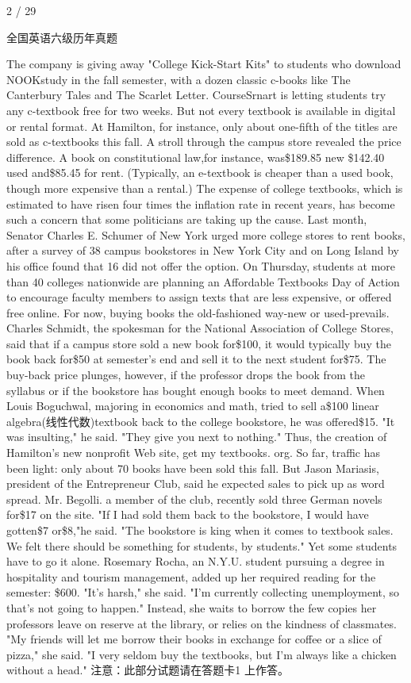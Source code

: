 \documentclass[UTF8,11pt]{ctexart}
\begin{document}
2 / 29


全国英语六级历年真题


The company is giving away "College Kick-Start Kits" to students who download NOOKstudy in the fall semester, with a dozen classic c-books like The Canterbury Tales and The Scarlet Letter. CourseSrnart is letting students try any c-textbook free for two weeks. But not every textbook is available in digital or rental format. At Hamilton, for instance, only about one-fifth of the titles are sold as c-textbooks this fall. A stroll through the campus store revealed the price difference. A book on constitutional law,for instance, was\$189.85 new \$142.40 used and\$85.45 for rent. (Typically, an e-textbook is cheaper than a used book, though more expensive than a rental.) The expense of college textbooks, which is estimated to have risen four times the inflation rate in recent years, has become such a concern that some politicians are taking up the cause. Last month, Senator Charles E. Schumer of New York urged more college stores to rent books, after a survey of 38 campus bookstores in New York City and on Long Island by his office found that 16 did not offer the option. On Thursday, students at more than 40 colleges nationwide are planning an Affordable Textbooks Day of Action to encourage faculty members to assign texts that are less expensive, or offered free online. For now, buying books the old-fashioned way-new or used-prevails. Charles Schmidt, the spokesman for the National Association of College Stores, said that if a campus store sold a new book for\$100, it would typically buy the book back for\$50 at semester's end and sell it to the next student for\$75. The buy-back price plunges, however, if the professor drops the book from the syllabus or if the bookstore has bought enough books to meet demand. When Louis Boguchwal, majoring in economics and math, tried to sell a\$100 linear algebra(线性代数)textbook back to the college bookstore, he was offered\$15. "It was insulting," he said. "They give you next to nothing." Thus, the creation of Hamilton's new nonprofit Web site, get my textbooks. org. So far, traffic has been light: only about 70 books have been sold this fall. But Jason Mariasis, president of the Entrepreneur Club, said he expected sales to pick up as word spread. Mr. Begolli. a member of the club, recently sold three German novels for\$17 on the site. "If I had sold them back to the bookstore, I would have gotten\$7 or\$8,"he said. "The bookstore is king when it comes to textbook sales. We felt there should be something for students, by students." Yet some students have to go it alone. Rosemary Rocha, an N.Y.U. student pursuing a degree in hospitality and tourism management, added up her required reading for the semester: \$600. "It's harsh," she said. "I'm currently collecting unemployment, so that's not going to happen." Instead, she waits to borrow the few copies her professors leave on reserve at the library, or relies on the kindness of classmates. "My friends will let me borrow their books in exchange for coffee or a slice of pizza," she said. "I very seldom buy the textbooks, but I'm always like a chicken without a head." 注意：此部分试题请在答题卡1 上作答。
\end{document}
